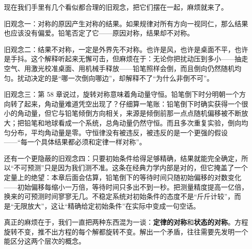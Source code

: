 \begin{mainline}
现在我们手里有几个看似都合理的旧观念，把它们摆在一起，麻烦就来了。

旧观念一：对称的原因产生对称的结果。如果规律对所有方向一视同仁，那么结果也应该没有偏爱。铅笔否定了它——原因对称，结果却不对称。

旧观念二：结果不对称，一定是外界先不对称。也许是风，也许是桌面不平，也许是手抖。这个解释听起来无懈可击，但麻烦在于：无论你把扰动压到多小——抽走空气、用激光校准桌面、用机械手释放——铅笔照样会倒，而且倒向仍然随机均匀。扰动决定的是“哪一次倒向哪边”，却解释不了“为什么非倒不可”。

旧观念三：第 58 章说过，旋转对称意味着角动量守恒。铅笔倒下时分明朝一个方向转了起来，角动量难道凭空出现了？仔细算一笔账：铅笔倒下时确实获得一个很小的角动量，但它与铅笔倾倒方向相关，来源是倾倒前那一点点随机偏移被不断放大；把铅笔和地球看成一个系统，总角动量仍然守恒。而且多次重复实验，倒向均匀分布，平均角动量是零。守恒律没有被违反，被违反的是一个更强的假设——“每一个具体结果都必须和定律一样对称”。

还有一个更隐蔽的旧观念四：只要初始条件给得足够精确，结果就能完全确定，所以“不可预测”只是因为我们测不准。这条在经典力学内部是对的，但它掩盖了一个定量上的绝望：本章后面会估算，铅笔倒下的等待时间只随初始偏移的对数变化——初始偏移每缩小一万倍，等待时间只多出不到一秒。把测量精度提高一亿倍，换来的可预测时间寥寥无几。不稳定系统对初始条件的态度不是“斤斤计较”，而是“无限放大”，这让“精确给定初始条件”在实际中变成一句空话。

真正的麻烦在于，我们一直把两种东西混为一谈：\textbf{定律的对称}和\textbf{状态的对称}。方程旋转不变，推不出方程的每个解都旋转不变。解出一个矛盾，往往需要先发明一个能区分这两个层次的概念。
\end{mainline}


